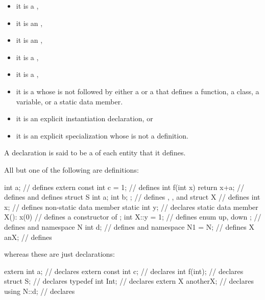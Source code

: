 \begin{itemize}
\item it is
a ,
\item
it is an
,
\item
it is an
,
\item it is
a ,
\item it is
a ,
\item it is
a 
whose  is not followed by
either a  or a 
that defines a function, a class, a variable, or a static data member.
\item it is
an explicit instantiation declaration, or
\item it is
an explicit specialization whose
 is not a definition.
\end{itemize}
A declaration is said to be a  of each entity that it defines.
\begin{example}
All but one of the following are definitions:
\begin{codeblock}
int a;                          // defines 
extern const int c = 1;         // defines 
int f(int x) { return x+a; }    // defines  and defines 
struct S { int a; int b; };     // defines , , and 
struct X {                      // defines 
  int x;                        // defines non-static data member 
  static int y;                 // declares static data member 
  X(): x(0) { }                 // defines a constructor of 
};
int X::y = 1;                   // defines 
enum { up, down };              // defines  and 
namespace N { int d; }          // defines  and 
namespace N1 = N;               // defines 
X anX;                          // defines 

\end{codeblock}
whereas these are just declarations:
\begin{codeblock}
extern int a;                   // declares 
extern const int c;             // declares 
int f(int);                     // declares 
struct S;                       // declares 
typedef int Int;                // declares 
extern X anotherX;              // declares 
using N::d;                     // declares 
\end{codeblock}
\end{example}

